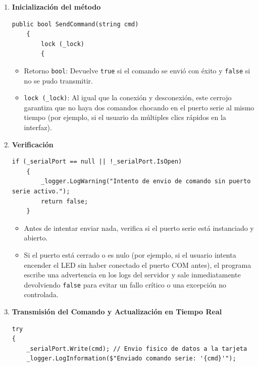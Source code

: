 \documentclass[
10pt, %
a4paper, %
oneside, %
headinclude,footinclude, %
BCOR5mm, %
]{scrartcl}
\begin{document}
\begin{enumerate}
	\item \textbf{Inicialización del método}
	\begin{lstlisting}[style=VSCodeDark]
	public bool SendCommand(string cmd)
	{
		lock (_lock)
		{\end{lstlisting}
	\begin{itemize}
		\item Retorno \texttt{bool}: Devuelve \texttt{true} si el comando se envió con éxito y \texttt{false} si no se pudo transmitir.
		\item \texttt{lock (\_lock)}: Al igual que la conexión y desconexión, este cerrojo garantiza que no haya dos comandos chocando en el puerto serie al mismo tiempo (por ejemplo, si el usuario da múltiples clics rápidos en la interfaz).
	\end{itemize}
	\item \textbf{Verificación}
	\begin{lstlisting}[style=VSCodeDark]
	if (_serialPort == null || !_serialPort.IsOpen)
	{
		_logger.LogWarning("Intento de envio de comando sin puerto serie activo.");
		return false;
	}
	\end{lstlisting}
	\begin{itemize}
		\item Antes de intentar enviar nada, verifica si el puerto serie está instanciado y abierto.
		\item Si el puerto está cerrado o es nulo (por ejemplo, si el usuario intenta encender el LED sin haber conectado el puerto COM antes), el programa escribe una advertencia en los logs del servidor y sale inmediatamente devolviendo \texttt{false} para evitar un fallo crítico o una excepción no controlada.
	\end{itemize}
	\item \textbf{Transmisión del Comando y Actualización en Tiempo Real}
	\begin{lstlisting}[style=VSCodeDark]
try
{
	_serialPort.Write(cmd); // Envio fisico de datos a la tarjeta
	_logger.LogInformation($"Enviado comando serie: '{cmd}'");
	

\end{lstlisting}
\end{enumerate}
\end{document}
